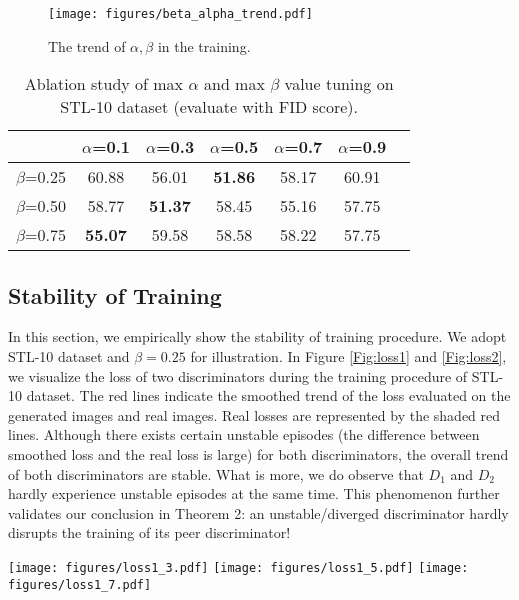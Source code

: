  \begin{figure}
    \centering
    {\texttt{[image: figures/beta\_alpha\_trend.pdf]}
    }
    \caption{The trend of $\alpha, \beta$ in the training.}
    \end{figure}
\begin{table}
    \centering
  \vspace{-0.3in}
\begin{tabular}{l|cccccc}
\hline
            &$\alpha$=0.1    & $\alpha$=0.3   &$\alpha$=0.5   & \:\:\:\:$\alpha$=0.7\:\:\:\:\: &\:\:$\alpha$=0.9\:\:   \\ \hline
$\beta$=0.25	& 60.88 & 56.01	& \textbf{51.86} & 58.17 & 60.91 \\
$\beta$=0.50	& 58.77 & \textbf{51.37} & 58.45 & 55.16 & 57.75 \\
$\beta$=0.75	& \textbf{55.07} & 59.58 &58.58 & 58.22 & 57.75 \\ \hline
\end{tabular}
\caption{Ablation study of max $\alpha$ and max $\beta$ value tuning on STL-10 dataset (evaluate with FID score).}
\end{table}

\subsection{Stability of Training}\label{app:stab}
In this section, we empirically show the stability of \PG{} training procedure. We adopt STL-10 dataset and $\beta=0.25$ for illustration. In Figure \ref{Fig:loss1} and \ref{Fig:loss2}, we visualize the loss of two discriminators during the training procedure of STL-10 dataset. The red lines indicate the smoothed trend of the loss evaluated on the generated images and real images. Real losses are represented by the shaded red lines. Although there exists certain unstable episodes (the difference between smoothed loss and the real loss is large) for both discriminators, the overall trend of both discriminators are stable. What is more, we do observe that $D_1$ and $D_2$ hardly experience unstable episodes at the same time. This phenomenon further validates our conclusion in Theorem 2: an unstable/diverged discriminator hardly disrupts the training of its peer discriminator!

\begin{figure*}[!htb]
\vspace{-0.15in}
    \centering
{\texttt{[image: figures/loss1\_3.pdf]}
    }
{\texttt{[image: figures/loss1\_5.pdf]} 
    }
    {\texttt{[image: figures/loss1\_7.pdf]}
    }
        \vspace{-5pt}
        \caption{The loss of $D_1$ in \PG{} with $\beta=0.25$ on STL-10 dataset, left: $\alpha=0.3$; middle: $0.5$; right: $\alpha=0.7$.}
    \label{Fig:loss1}
\end{figure*}

